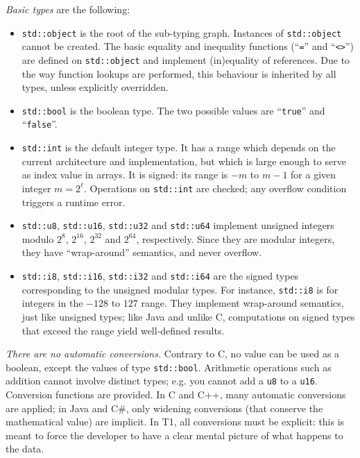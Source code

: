 \emph{Basic types} are the following:
\begin{itemize}

    \item \verb|std::object| is the root of the sub-typing graph.
    Instances of \verb|std::object| cannot be created. The basic
    equality and inequality functions (``\verb|=|'' and ``\verb|<>|'')
    are defined on \verb|std::object| and implement (in)equality of
    references. Due to the way function lookups are performed, this
    behaviour is inherited by all types, unless explicitly overridden.

    \item \verb|std::bool| is the boolean type. The two possible values
    are ``\verb|true|'' and ``\verb|false|''.

    \item \verb|std::int| is the default integer type. It has a range
    which depends on the current architecture and implementation, but
    which is large enough to serve as index value in arrays. It is
    signed: its range is $-m$ to $m-1$ for a given integer $m = 2^\ell$.
    Operations on \verb|std::int| are checked; any overflow condition
    triggers a runtime error.

    \item \verb|std::u8|, \verb|std::u16|, \verb|std::u32| and
    \verb|std::u64| implement unsigned integers modulo $2^8$, $2^{16}$,
    $2^{32}$ and $2^{64}$, respectively. Since they are modular integers,
    they have ``wrap-around'' semantics, and never overflow.

    \item \verb|std::i8|, \verb|std::i16|, \verb|std::i32| and
    \verb|std::i64| are the signed types corresponding to the unsigned
    modular types. For instance, \verb|std::i8| is for integers in the
    $-128$ to $127$ range. They implement wrap-around semantics, just
    like unsigned types; like Java and unlike C, computations on signed
    types that exceed the range yield well-defined results.

\end{itemize}

\emph{There are no automatic conversions.} Contrary to C, no value can
be used as a boolean, except the values of type \verb|std::bool|.
Arithmetic operations such as addition cannot involve distinct types;
e.g. you cannot add a \verb|u8| to a \verb|u16|. Conversion functions
are provided. In C and C++, many automatic conversions are applied; in
Java and C\#, only widening conversions (that conserve the mathematical
value) are implicit. In T1, all conversions must be explicit: this is
meant to force the developer to have a clear mental picture of what
happens to the data.


